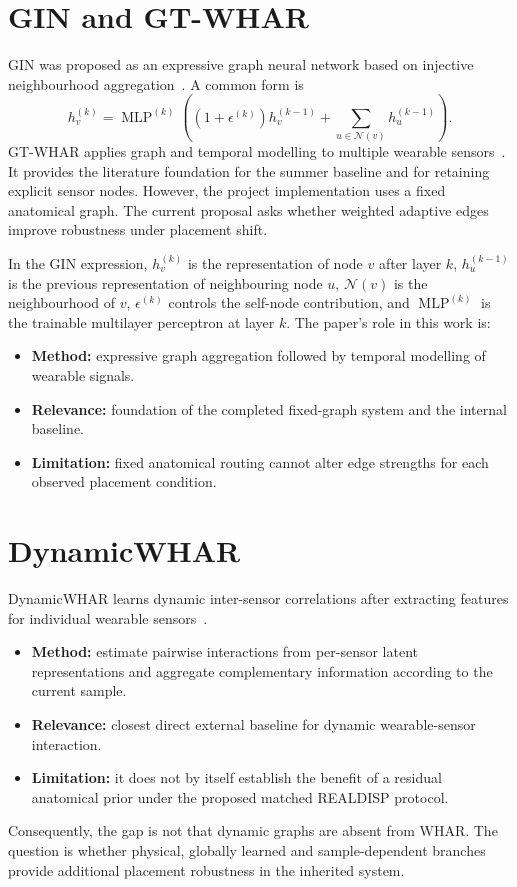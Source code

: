 \documentclass[12pt,a4paper,twoside,openright]{report}
\begin{document}
\section{GIN and GT-WHAR}
GIN was proposed as an expressive graph neural network based on injective neighbourhood aggregation~\cite{gin}. A common form is
\[
h_v^{(k)}=\operatorname{MLP}^{(k)}
\left((1+\epsilon^{(k)})h_v^{(k-1)}+
\sum_{u\in\mathcal N(v)}h_u^{(k-1)}\right).
\]
GT-WHAR applies graph and temporal modelling to multiple wearable sensors~\cite{gtwhar}. It provides the literature foundation for the summer baseline and for retaining explicit sensor nodes. However, the project implementation uses a fixed anatomical graph. The current proposal asks whether weighted adaptive edges improve robustness under placement shift.

In the GIN expression, $h_v^{(k)}$ is the representation of node $v$ after layer $k$, $h_u^{(k-1)}$ is the previous representation of neighbouring node $u$, $\mathcal N(v)$ is the neighbourhood of $v$, $\epsilon^{(k)}$ controls the self-node contribution, and $\operatorname{MLP}^{(k)}$ is the trainable multilayer perceptron at layer $k$. The paper's role in this work is:
\begin{itemize}
\item \textbf{Method:} expressive graph aggregation followed by temporal modelling of wearable signals.
\item \textbf{Relevance:} foundation of the completed fixed-graph system and the internal baseline.
\item \textbf{Limitation:} fixed anatomical routing cannot alter edge strengths for each observed placement condition.
\end{itemize}

\section{DynamicWHAR}
DynamicWHAR learns dynamic inter-sensor correlations after extracting features for individual wearable sensors~\cite{dynamicwhar}.
\begin{itemize}
\item \textbf{Method:} estimate pairwise interactions from per-sensor latent representations and aggregate complementary information according to the current sample.
\item \textbf{Relevance:} closest direct external baseline for dynamic wearable-sensor interaction.
\item \textbf{Limitation:} it does not by itself establish the benefit of a residual anatomical prior under the proposed matched REALDISP protocol.
\end{itemize}
Consequently, the gap is not that dynamic graphs are absent from WHAR. The question is whether physical, globally learned and sample-dependent branches provide additional placement robustness in the inherited system.
\end{document}
